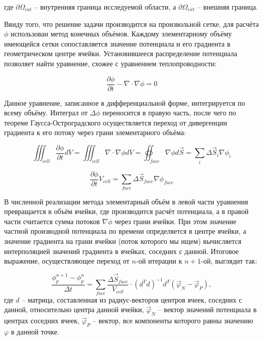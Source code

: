 \documentclass[a4paper,12pt]{article}
\begin{document}
\noindent
где $\partial \Omega_{int}$ -- внутренняя граница исследуемой области, а $\partial \Omega_{ext}$ -- внешняя граница.

Ввиду того, что решение задачи производится на произвольной сетке, для расчёта $\phi$ использован метод конечных объёмов. Каждому элементарному объёму имеющейся сетки сопоставляется значение потенциала и его градиента в геометрическом центре ячейки. Установившееся распределение потенциала позволяет найти уравнение, схожее с уравнением теплопроводности:

\begin{equation}
    \frac{\partial \phi}{\partial t} - \nabla \cdot \nabla \phi = 0
\end{equation}

Данное уравнение, записанное в дифференциальной форме, интегрируется по всему объёму. Интеграл от $\Delta \phi$ переносится в правую часть, после чего по теореме Гаусса-Остроградского осуществляется переход от дивергенции градиента к его потоку через грани элементарного объёма:

\begin{equation}
    \iiint_{cell} \frac{\partial \phi}{\partial t} dV = \iiint_{cell} \nabla \cdot \nabla \phi dV = \oiint_{face} \nabla \phi d \vec S = \sum_i \Delta \vec S_i \nabla \phi_i
\end{equation}

\begin{equation}
    \frac{\partial \phi}{\partial t} V_{cell} = \sum_{face} \Delta \vec S_{face} \nabla \phi_{face}
\end{equation}

В численной реализации метода элементарный объём в левой части уравнения превращается в объём ячейки, где производится расчёт потенциала, а в правой части считается сумма потоков $\nabla \phi$ через грани ячейки. При этом значение частной производной потенциала по времени определяется в центре ячейки, а значение градиента на грани ячейки (поток которого мы ищем) вычисляется интерполяцией значений градиента в ячейках, соседних с данной.
Итоговое выражение, осуществляющее переход от $n$-ой итерации к $n+1$-ой, выглядит так:

\begin{equation}
    \frac{\phi_{p}^{n+1} - \phi_{p}^{n}}{\Delta t} = \sum_{face} \frac{\Delta \vec S_{face}}{V_{cell}} \cdot (d^T d)^{-1} d^T (\vec{\varphi}_N - \vec{\varphi}_P),
\end{equation}
где $d$ -- матрица, составленная из радиус-векторов центров ячеек, соседних с данной, относительно центра данной ячейки, $\vec{\varphi}_N$ -- вектор значений потенциала в центрах соседних ячеек, $\vec{\varphi}_P$ -- вектор, все компоненты которого равны значению $\varphi$ в данной точке.
\end{document}
